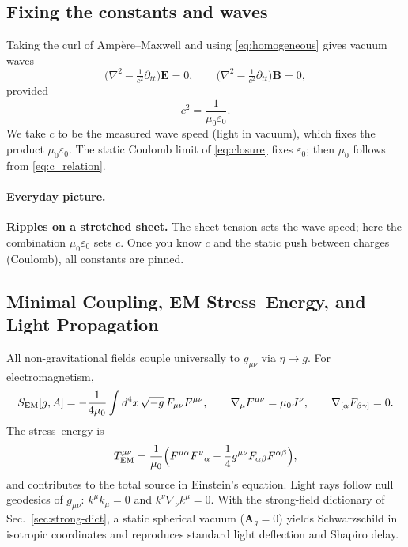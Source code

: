 \subsection{Fixing the constants and waves}
Taking the curl of Amp\`ere–Maxwell and using \eqref{eq:homogeneous} gives vacuum waves
\[
\big(\nabla^2 - \tfrac{1}{c^2}\partial_{tt}\big)\mathbf E=0,
\qquad
\big(\nabla^2 - \tfrac{1}{c^2}\partial_{tt}\big)\mathbf B=0,
\]
provided
\begin{equation}
c^2=\frac{1}{\mu_0\varepsilon_0}.
\label{eq:c_relation}
\end{equation}
We take $c$ to be the measured wave speed (light in vacuum), which fixes the product $\mu_0\varepsilon_0$. The static Coulomb limit of \eqref{eq:closure} fixes $\varepsilon_0$; then $\mu_0$ follows from \eqref{eq:c_relation}.

\paragraph{Everyday picture.}
\textbf{Ripples on a stretched sheet.} The sheet tension sets the wave speed; here the combination $\mu_0\varepsilon_0$ sets $c$. Once you know $c$ and the static push between charges (Coulomb), all constants are pinned.

\subsection{Minimal Coupling, EM Stress--Energy, and Light Propagation}
\label{sec:EM-coupling}
All non-gravitational fields couple universally to $g_{\mu\nu}$ via $\eta\to g$.
For electromagnetism,
\begin{equation}
S_{\rm EM}[g,A]=-\frac{1}{4\mu_0}\int d^4x\,\sqrt{-g}\,F_{\mu\nu}F^{\mu\nu},\qquad
\nabla_\mu F^{\mu\nu}=\mu_0 J^\nu,\qquad \nabla_{[\alpha}F_{\beta\gamma]}=0.
\label{eq:EM-covariant}
\end{equation}
The stress--energy is
\begin{equation}
T^{\mu\nu}_{\rm EM}=\frac{1}{\mu_0}\Big(F^{\mu\alpha}F^\nu{}_\alpha-\frac{1}{4}g^{\mu\nu}F_{\alpha\beta}F^{\alpha\beta}\Big),
\label{eq:EM-Tmunu}
\end{equation}
and contributes to the total source in Einstein’s equation.
Light rays follow null geodesics of $g_{\mu\nu}$: $k^\mu k_\mu=0$ and $k^\nu\nabla_\nu k^\mu=0$.
With the strong-field dictionary of Sec.~\ref{sec:strong-dict}, a static spherical vacuum ($\mathbf A_g=0$) yields Schwarzschild in isotropic coordinates and reproduces standard light deflection and Shapiro delay.

